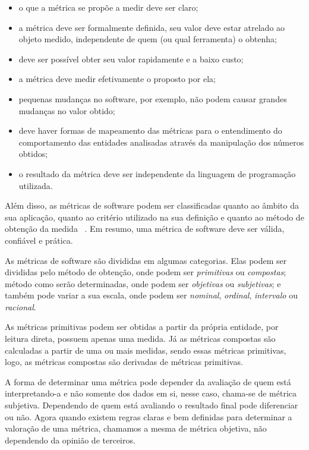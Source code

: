 \begin{itemize}
  \item o que a métrica se propõe a medir deve ser claro;
  \item a métrica deve ser formalmente definida, seu valor deve estar atrelado ao objeto medido, independente de quem (ou 
    qual ferramenta) o obtenha;
  \item deve ser possível obter seu valor rapidamente e a baixo custo;
  \item a métrica deve medir efetivamente o proposto por ela;
  \item pequenas mudanças no software, por exemplo, não podem causar grandes mudanças no valor obtido;
  \item deve haver formas de mapeamento das métricas para o entendimento do comportamento das entidades analisadas através 
    da manipulação dos números obtidos;
  \item o resultado da métrica deve ser independente da linguagem de programação utilizada.
\end{itemize}

Além disso, as métricas de software podem ser classificadas quanto ao âmbito da sua aplicação, quanto ao critério utilizado 
na sua definição e quanto ao método de obtenção da medida ~\cite{meirelles2013}. Em resumo, uma métrica de software deve
ser válida, confiável e prática.

As métricas de software são divididas em algumas categorias. Elas podem ser divididas pelo método de obtenção, onde podem
ser \textit{primitivas} ou \textit{compostas}; método como serão determinadas, onde podem ser \textit{objetivas} ou 
\textit{subjetivas}; e também pode variar a sua escala, onde podem ser \textit{nominal}, \textit{ordinal}, \textit{intervalo}
ou \textit{racional}.

As métricas primitivas podem ser obtidas a partir da própria entidade, por
leitura direta, possuem apenas uma medida. Já as
métricas compostas são calculadas a partir de uma ou mais medidas, sendo essas métricas primitivas, logo, as métricas compostas
são derivadas de métricas primitivas. 

A forma de determinar uma métrica pode depender da avaliação de quem está interpretando-a e não somente dos dados em si, nesse
caso, chama-se de métrica subjetiva. Dependendo de quem está avaliando o resultado final pode diferenciar ou não. Agora quando
existem regras claras e bem definidas para determinar a valoração de uma métrica, chamamos a mesma de métrica objetiva, não
dependendo da opinião de terceiros.

